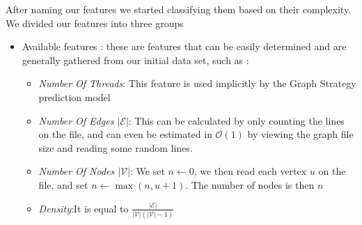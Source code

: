 After naming our features we started classifying them based on their complexity. We divided our features into three groups

\begin{itemize}
    \item Available features : these are features that can be easily determined and are generally gathered from our initial data set, such as :
    \begin{itemize}
        \item \textit{Number Of Threads}: This feature is used implicitly by the Graph Strategy prediction model 
        \item \textit{Number Of Edges $\lvert\mathcal{E}\rvert$}: This can be calculated by only counting the lines on the file, and can even be estimated in $\mathcal{O}(1)$ by viewing the graph file size and reading some random lines.
        \item \textit{Number Of Nodes $\lvert\mathcal{V}\rvert$}: We set $n\leftarrow 0$, we then read each vertex $u$ on the file, and set $n\leftarrow \max(n,u+1).$ The number of nodes is then $n$
        \item \textit{Density}:It is equal to $\frac{\lvert\mathcal{E}\rvert}{\lvert\mathcal{V}\rvert(\lvert\mathcal{V}\rvert-1)}$


\end{itemize}
\end{itemize}
